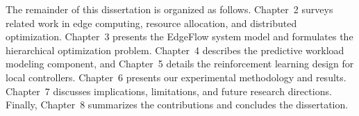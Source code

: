 \documentclass[12pt,oneside]{report}
\begin{document}
The remainder of this dissertation is organized as follows. Chapter~2 surveys related work in edge computing, resource allocation, and distributed optimization. Chapter~3 presents the EdgeFlow system model and formulates the hierarchical optimization problem. Chapter~4 describes the predictive workload modeling component, and Chapter~5 details the reinforcement learning design for local controllers. Chapter~6 presents our experimental methodology and results. Chapter~7 discusses implications, limitations, and future research directions. Finally, Chapter~8 summarizes the contributions and concludes the dissertation.
\end{document}
